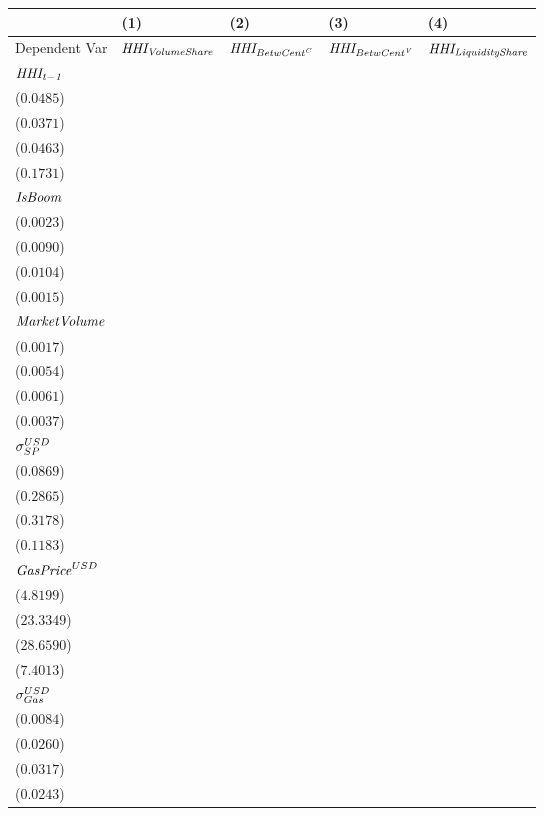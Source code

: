 \begin{tabular}{lllll}
\toprule
{} &                                       (1) &                                        (2) &                                       (3) &                                     (4) \\
\midrule
Dependent Var               &                 ${\it HHI_{VolumeShare}}$ &                 ${\it HHI_{{BetwCent}^C}}$ &                ${\it HHI_{{BetwCent}^V}}$ &            ${\it HHI_{LiquidityShare}}$ \\
$\it HHI_{t-1}$             &   \makecell{$0.4466^{***}$ \\ ($0.0485$)} &    \makecell{$0.6562^{***}$ \\ ($0.0371$)} &   \makecell{$0.6605^{***}$ \\ ($0.0463$)} &  \makecell{$0.3992^{**}$ \\ ($0.1731$)} \\
${\it IsBoom}$              &      \makecell{$0.0034^{}$ \\ ($0.0023$)} &    \makecell{$0.0311^{***}$ \\ ($0.0090$)} &   \makecell{$0.0396^{***}$ \\ ($0.0104$)} &  \makecell{$0.0039^{**}$ \\ ($0.0015$)} \\
${\it MarketVolume}$        &      \makecell{$0.0023^{}$ \\ ($0.0017$)} &       \makecell{$0.0036^{}$ \\ ($0.0054$)} &     \makecell{$-0.0030^{}$ \\ ($0.0061$)} &   \makecell{$-0.0043^{}$ \\ ($0.0037$)} \\
${\it \sigma}^{USD}_{SP}$   &      \makecell{$0.0367^{}$ \\ ($0.0869$)} &       \makecell{$0.4625^{}$ \\ ($0.2865$)} &     \makecell{$-0.4806^{}$ \\ ($0.3178$)} &  \makecell{$-0.2154^{*}$ \\ ($0.1183$)} \\
${\it GasPrice}^{USD}$      &  \makecell{$-11.1290^{**}$ \\ ($4.8199$)} &  \makecell{$69.8927^{***}$ \\ ($23.3349$)} &  \makecell{$71.3461^{**}$ \\ ($28.6590$)} &   \makecell{$-9.1305^{}$ \\ ($7.4013$)} \\
${\it \sigma}_{Gas}^{USD}$  &    \makecell{$-0.0162^{*}$ \\ ($0.0084$)} &     \makecell{$0.0652^{**}$ \\ ($0.0260$)} &    \makecell{$0.0740^{**}$ \\ ($0.0317$)} &    \makecell{$0.0096^{}$ \\ ($0.0243$)} \\

\end{tabular}
